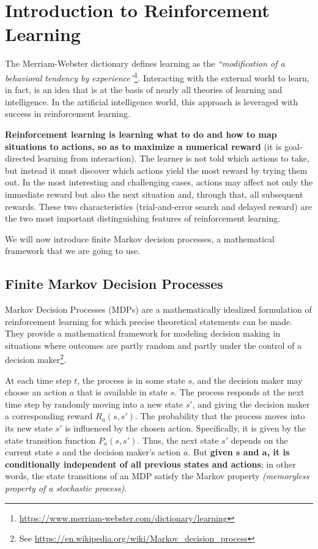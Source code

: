 \chapter{Introduction to Reinforcement Learning}
The Merriam-Webster dictionary defines learning as the \textit{``modification of a behavioral tendency by experience''}\footnote{\url{https://www.merriam-webster.com/dictionary/learning}}. Interacting with the external world to learn, in fact, is an idea that is at the basis of nearly all theories of learning and intelligence. In the artificial intelligence world, this approach is leveraged with success in reinforcement learning.

\textbf{Reinforcement learning is learning what to do and how to map situations to actions, so as to maximize a numerical reward} (it is goal-directed learning from interaction). The learner is not told which actions to take, but instead it must discover which actions yield the most reward by trying them out. In the most interesting and challenging cases, actions may affect not only the immediate reward but also the next situation and, through that, all subsequent rewards. These two characteristics (trial-and-error search and delayed reward) are the two most important distinguishing features of reinforcement learning.

We will now introduce finite Markov decision processes, a mathematical framework that we are going to use.

\section{Finite Markov Decision Processes}
Markov Decision Processes (MDPs) are a mathematically idealized formulation of reinforcement learning for which precise theoretical statements can be made. They provide a mathematical framework for modeling decision making in situations where outcomes are partly random and partly under the control of a decision maker\footnote{See \url{https://en.wikipedia.org/wiki/Markov_decision_process}}.

At each time step $t$, the process is in some state $s$, and the decision maker may choose an action $a$ that is available in state $s$. The process responds at the next time step by randomly moving into a new state $s'$, and giving the decision maker a corresponding reward $R_a(s,s')$. The probability that the process moves into its new state $s'$ is influenced by the chosen action. Specifically, it is given by the state transition function $P_a(s,s')$. Thus, the next state $s'$ depends on the current state $s$ and the decision maker's action $a$. But \textbf{given $\boldsymbol{s}$ and $\boldsymbol{a}$, it is conditionally independent of all previous states and actions}; in other words, the state transitions of an MDP satisfy the Markov property \textit{(memoryless property of a stochastic process)}.

